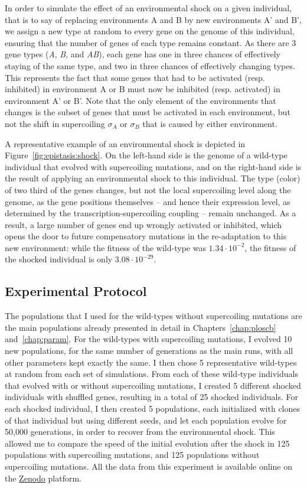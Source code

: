 In order to simulate the effect of an environmental shock on a given individual, that is to say of replacing environments A and B by new environments A' and B', we assign a new type at random to every gene on the genome of this individual, ensuring that the number of genes of each type remains constant.
As there are 3 gene types (\emph{A}, \emph{B}, and \emph{AB}), each gene has one in three chances of effectively staying of the same type, and two in three chances of effectively changing types.
This represents the fact that some genes that had to be activated (resp. inhibited) in environment A or B must now be inhibited (resp. activated) in environment A' or B'.
Note that the only element of the environments that changes is the subset of genes that must be activated in each environment, but not the shift in supercoiling $\sigma_A$ or $\sigma_B$ that is caused by either environment.

A representative example of an environmental shock is depicted in Figure~\ref{fig:epistasis:shock}.
On the left-hand side is the genome of a wild-type individual that evolved with supercoiling mutations, and on the right-hand side is the result of applying an environmental shock to this individual.
The type (color) of two third of the genes changes, but not the local supercoiling level along the genome, as the gene positions themselves -- and hence their expression level, as determined by the transcription-supercoiling coupling -- remain unchanged.
As a result, a large number of genes end up wrongly activated or inhibited, which opens the door to future compensatory mutations in the re-adaptation to this new environment: while the fitness of the wild-type was $1.34\cdot10^{-2}$, the fitness of the shocked individual is only $3.08\cdot10^{-29}$.

\subsection{Experimental Protocol}

The populations that I used for the wild-types without supercoiling mutations are the main populations already presented in detail in Chapters~\ref{chap:ploscb} and~\ref{chap:param}.
For the wild-types with supercoiling mutations, I evolved 10 new populations, for the same number of generations as the main runs, with all other parameters kept exactly the same.
I then chose 5 representative wild-types at random from each set of simulations.
From each of these wild-type individuals that evolved with or without supercoiling mutations, I created 5 different shocked individuals with shuffled genes, resulting in a total of 25 shocked individuals.
For each shocked individual, I then created 5 populations, each initialized with clones of that individual but using different seeds, and let each population evolve for 50,000 generations, in order to recover from the environmental shock.
This allowed me to compare the speed of the initial evolution after the shock in 125 populations with supercoiling mutations, and 125 populations without supercoiling mutations.
All the data from this experiment is available online on the \href{https://doi.org/10.5281/zenodo.7304834}{Zenodo} platform.


